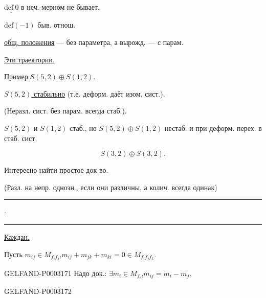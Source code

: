 $\underline{\underline{\mathrm{def}\ 0}}$ в неч.-мерном не бывает.

$\mathrm{def}(-1)$ быв. отнош.

\uline{общ. положения} --- без параметра, а вырожд. --- с парам.



\hfill{}

\uline{Эти траектории.}

\uline{Пример.}\qquad $S(5,2)\oplus S(1,2)$.

\uline{$S(5,2)$ стабильно} (т.е. деформ. даёт изом. сист.).

(Неразл. сист. без парам. всегда стаб.).

$S(5,2)$ и $S(1,2)$ стаб., но $S(5,2)\oplus S(1,2)$ нестаб. и при деформ. перех. в стаб. сист.

\begin{equation*}S(3,2)\oplus S(3,2).\end{equation*}

Интересно найти простое док-во.

(Разл. на непр. однозн., если они различны, а колич. всегда одинак)

\begin{center}\rule{20mm}{.6pt}\quad$\cdot$\quad\rule{20mm}{.6pt}\end{center}

\uline{Каждан.}

Пусть $m_{ij}\in M_{f_i f_j}$,\quad $m_{ij}+m_{jk}+m_{ki}=0\in M_{f_i f_j f_k}$.

\begin{GelfandAdjacentEvidence}{GELFAND-P000317}{1}
Надо док.: $\exists m_i\in M_{f_i}$,\quad $m_{ij}=m_i-m_j$.

\end{GelfandAdjacentEvidence}
\begin{GelfandAdjacentEvidence}{GELFAND-P000317}{2}


\end{GelfandAdjacentEvidence}


